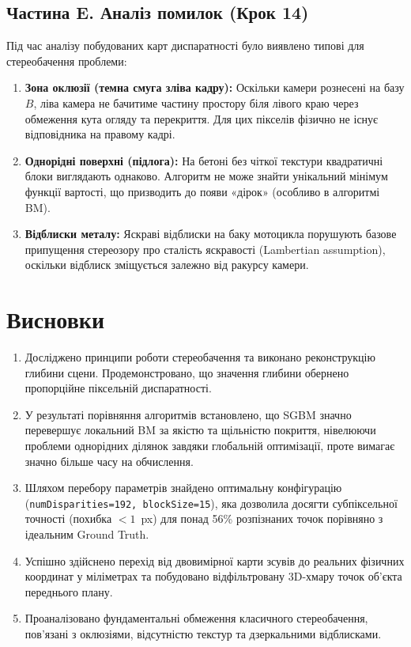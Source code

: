 \documentclass[a4paper,14pt]{extarticle}
\begin{document}
	\subsection{Частина E. Аналіз помилок (Крок 14)}
	Під час аналізу побудованих карт диспаратності було виявлено типові для стереобачення проблеми:
	\begin{enumerate}
		\item \textbf{Зона оклюзії (темна смуга зліва кадру):} Оскільки камери рознесені на базу $B$, ліва камера не бачитиме частину простору біля лівого краю через обмеження кута огляду та перекриття. Для цих пікселів фізично не існує відповідника на правому кадрі.
		\item \textbf{Однорідні поверхні (підлога):} На бетоні без чіткої текстури квадратичні блоки виглядають однаково. Алгоритм не може знайти унікальний мінімум функції вартості, що призводить до появи «дірок» (особливо в алгоритмі BM).
		\item \textbf{Відблиски металу:} Яскраві відблиски на баку мотоцикла порушують базове припущення стереозору про сталість яскравості (Lambertian assumption), оскільки відблиск зміщується залежно від ракурсу камери.
	\end{enumerate}
	
	\section*{Висновки}
	\begin{enumerate}
		\item Досліджено принципи роботи стереобачення та виконано реконструкцію глибини сцени. Продемонстровано, що значення глибини обернено пропорційне піксельній диспаратності.
		\item У результаті порівняння алгоритмів встановлено, що SGBM значно перевершує локальний BM за якістю та щільністю покриття, нівелюючи проблеми однорідних ділянок завдяки глобальній оптимізації, проте вимагає значно більше часу на обчислення.
		\item Шляхом перебору параметрів знайдено оптимальну конфігурацію (\texttt{numDisparities=192, blockSize=15}), яка дозволила досягти субпіксельної точності (похибка $<1$~px) для понад 56\% розпізнаних точок порівняно з ідеальним Ground Truth.
		\item Успішно здійснено перехід від двовимірної карти зсувів до реальних фізичних координат у міліметрах та побудовано відфільтровану 3D-хмару точок об'єкта переднього плану.
		\item Проаналізовано фундаментальні обмеження класичного стереобачення, пов'язані з оклюзіями, відсутністю текстур та дзеркальними відблисками.
	\end{enumerate}
	
\end{document}
